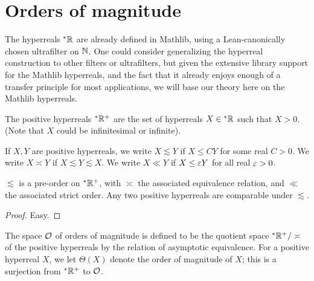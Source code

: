 \chapter{Orders of magnitude}\label{ch:order_of_magnitude}

The hyperreals ${}^* {\mathbb R}$ are already defined in Mathlib, using a Lean-canonically chosen ultrafilter on ${\mathbb N}$.  One could consider generalizing the hyperreal construction to other filters or ultrafilters, but given the extensive library support for the Mathlib hyperreals, and the fact that it already enjoys enough of a transfer principle for most applications, we will base our theory here on the Mathlib hyperreals.

\begin{definition}\label{pos-hyperreal}\leanok  The positive hyperreals ${}^* {\mathbb R}^+$ are the set of hyperreals $X \in {}^* {\mathbb R}$ such that $X > 0$.  (Note that $X$ could be infinitesimal or infinite).

If $X,Y$ are positive hyperreals, we write $X \lesssim Y$ if $X \leq CY$ for some real $C>0$.  We write $X \asymp Y$ if $X \lesssim Y \lesssim X$.  We write $X \ll Y$ if $X \leq \varepsilon Y$ for all real $\varepsilon>0$.
\end{definition}

\begin{lemma}\label{lesssim-order}\leanok  $\lesssim$ is a pre-order on ${}^* {\mathbb R}^+$, with $\asymp$ the associated equivalence relation, and $\ll$ the associated strict order.  Any two positive hyperreals are comparable under $\lesssim$.
\end{lemma}

\begin{proof}\leanok Easy.
\end{proof}

\begin{definition}\label{ord-def}\leanok The space ${\mathcal O}$ of orders of magnitude is defined to be the quotient space ${}^* {\mathbb R}^+ / \asymp$ of the positive hyperreals by the relation of asymptotic equivalence.  For a positive hyperreal $X$, we let $\Theta(X)$ denote the order of magnitude of $X$; this is a surjection from ${}^* {\mathbb R}^+$ to ${\mathcal O}$.
\end{definition}


